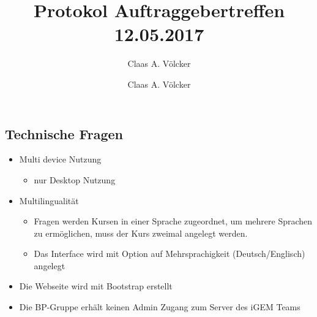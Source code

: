 \documentclass[colorback, accentcolor=tud1c, paper=a4]{tudexercise}
\title{Protokol Auftraggebertreffen 12.05.2017}
\subtitle{Claas A. Völcker}
\author{Claas A. Völcker}
\begin{document}
	
	\maketitle
\begin{multicols}{2}
\subsection*{Technische Fragen}
	\begin{itemize}
	\item Multi device Nutzung
		\begin{itemize}
		\item nur Desktop Nutzung
		\end{itemize} 	
	\item Multilingualität
		\begin{itemize}
		\item Fragen werden Kursen in einer Sprache zugeordnet, um mehrere Sprachen zu ermöglichen, muss der Kurs zweimal angelegt werden.
		\item Das Interface wird mit Option auf Mehrsprachigkeit (Deutsch/Englisch) angelegt
		\end{itemize}
	\item Die Webseite wird mit Bootstrap erstellt
	\item Die BP-Gruppe erhält keinen Admin Zugang zum Server des iGEM Teams
	\end{itemize}

\end{multicols}
\end{document}

